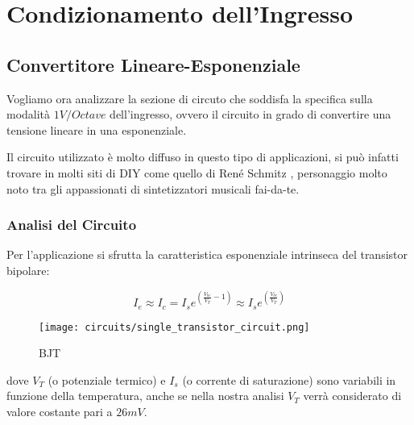 \chapter{Condizionamento dell'Ingresso}


\section{Convertitore Lineare-Esponenziale}


Vogliamo ora analizzare la sezione di circuto che soddisfa la specifica sulla modalità
$1V/Octave$ dell'ingresso, ovvero il circuito in grado di convertire una tensione
lineare in una esponenziale.

Il circuito utilizzato è molto diffuso in questo tipo di applicazioni, si può infatti
trovare in molti siti di DIY come quello di René Schmitz \cite{expo_converter}, personaggio
molto noto tra gli appassionati di sintetizzatori musicali fai-da-te.


\subsection*{Analisi del Circuito}


Per l'applicazione si sfrutta la caratteristica esponenziale intrinseca del transistor
bipolare:

\begin{displaymath}
    I_e\approx I_c=I_se^{\left(\frac{V_{be}}{V_T}-1\right)}
    \approx I_se^{\left(\frac{V_{be}}{V_T}\right)}
\end{displaymath}

\begin{figure}[ht]
    \centering
    \texttt{[image: circuits/single\_transistor\_circuit.png]}
    \caption{BJT}
    \label{bjt}
\end{figure}

dove $V_T$ (o potenziale termico) e $I_s$ (o corrente di saturazione) sono variabili in
funzione della temperatura, anche se nella nostra analisi $V_T$ verrà considerato di
valore costante pari a $26mV$.

